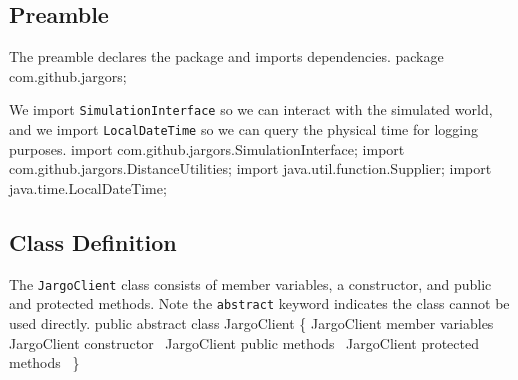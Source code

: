 \documentclass{article}
\def\nwendcode{\endtrivlist \endgroup}
\let\nwdocspar=\par
\begin{document}
\subsection{Preamble}
The preamble declares the package and imports dependencies.
\nwenddocs{}\endmoddef{}
package com.github.jargors;
\nwendcode{}\nwdocspar
We import {\tt{}SimulationInterface} so we can interact with the simulated world,
and we import {\tt{}LocalDateTime} so we can query the physical time for
logging purposes.
\nwenddocs{}\plusendmoddef
import com.github.jargors.SimulationInterface;
import com.github.jargors.DistanceUtilities;
import java.util.function.Supplier;
import java.time.LocalDateTime;
\nwendcode{}\nwdocspar

\subsection{Class Definition}
The {\tt{}JargoClient} class consists of member variables, a constructor, and
public and protected methods. Note the {\tt{}abstract} keyword indicates the class
cannot be used directly.
\nwenddocs{}\endmoddef{}
public abstract class JargoClient \{
  \LA{}\code{}JargoClient\edoc{} member variables~{\nwtagstyle{}}\RA{}
  \LA{}\code{}JargoClient\edoc{} constructor~{\nwtagstyle{}}\RA{}
  \LA{}\code{}JargoClient\edoc{} public methods~{\nwtagstyle{}}\RA{}
  \LA{}\code{}JargoClient\edoc{} protected methods~{\nwtagstyle{}}\RA{}
\}
\nwendcode{}\nwdocspar
\end{document}
